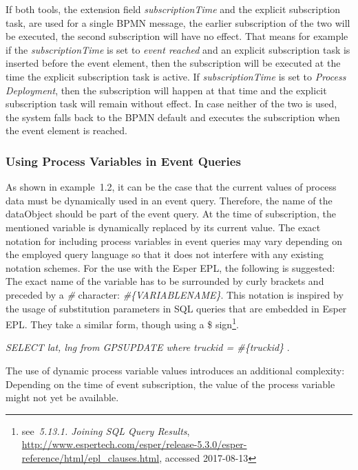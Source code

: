 If both tools, the extension field \textit{subscriptionTime} and the explicit subscription task, are used for a single BPMN message, the earlier subscription of the two will be executed, the second subscription will have no effect.
That means for example if the \textit{subscriptionTime} is set to \textit{event reached} and an explicit subscription task is inserted before the event element, then the subscription will be executed at the time the explicit subscription task is active.
If \textit{subscriptionTime} is set to \textit{Process Deployment}, then the subscription will happen at that time and the explicit subscription task will remain without effect.
In case neither of the two is used, the system falls back to the BPMN default and executes the subscription when the event element is reached.

\subsubsection{Using Process Variables in Event Queries}


As shown in example~1.2, it can be the case that the current values of process data must be dynamically used in an event query. 
Therefore, the name of the dataObject should be part of the event query. At the time of subscription, the mentioned variable is dynamically replaced by its current value.
The exact notation for including process variables in event queries may vary depending on the employed query language so that it does not interfere with any existing notation schemes.
For the use with the Esper EPL, the following is suggested: The exact name of the variable has to be surrounded by curly brackets and preceded by a \textit{\#} character: \textit{\#\{VARIABLENAME\}}.
This notation is inspired by the usage of substitution parameters in SQL queries that are embedded in Esper EPL. They take a similar form, though using a \$ sign\footnote{see~\textit{5.13.1. Joining SQL Query Results}, \url{http://www.espertech.com/esper/release-5.3.0/esper-reference/html/epl_clauses.html}, accessed 2017-08-13}.

\textit{SELECT lat, lng from GPSUPDATE where truckid = \#\{truckid\} }.

The use of dynamic process variable values introduces an additional complexity: Depending on the time of event subscription, the value of the process variable might not yet be available.


